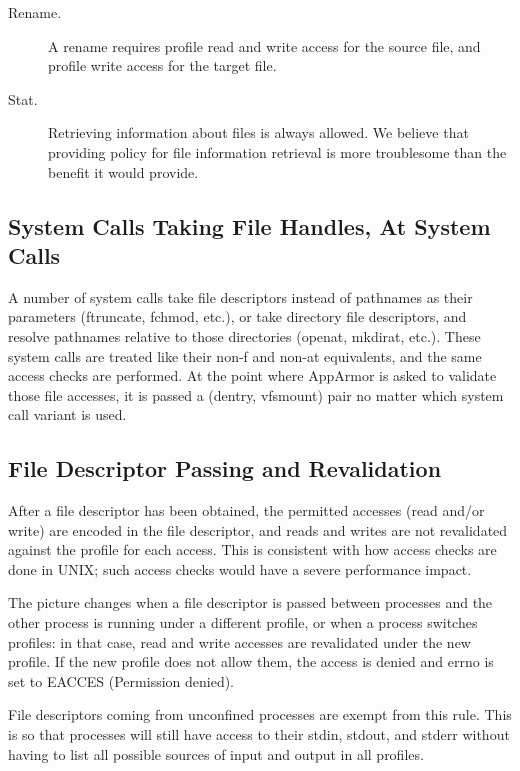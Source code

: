 \documentclass[a4paper]{article}
\begin{document}
\begin{description}
\item[Rename.]
A rename requires profile read and write access for the source
file, and profile write access for the target file.

\item[Stat.]
Retrieving information about files is always allowed. We believe
that providing policy for file information retrieval is more
troublesome than the benefit it would provide.

\end{description}


\subsection{System Calls Taking File Handles, At System Calls}

A number of system calls take file descriptors instead of pathnames as
their parameters (ftruncate, fchmod, etc.), or take directory file
descriptors, and resolve pathnames relative to those directories
(openat, mkdirat, etc.).  These system calls are treated like their
non-f and non-at equivalents, and the same access checks are performed.
At the point where AppArmor is asked to validate those file accesses, it
is passed a (dentry, vfsmount) pair no matter which system call variant
is used.


\subsection{File Descriptor Passing and Revalidation}

After a file descriptor has been obtained, the permitted accesses (read
and/or write) are encoded in the file descriptor, and reads and writes
are not revalidated against the profile for each access.  This is
consistent with how access checks are done in UNIX; such access checks
would have a severe performance impact.

The picture changes when a file descriptor is passed between processes
and the other process is running under a different profile, or when a
process switches profiles: in that case, read and write accesses are
revalidated under the new profile.  If the new profile does not allow
them, the access is denied and errno is set to EACCES (Permission
denied).

File descriptors coming from unconfined processes are exempt from this
rule.  This is so that processes will still have access to their stdin,
stdout, and stderr without having to list all possible sources of input
and output in all profiles.
\end{document}

